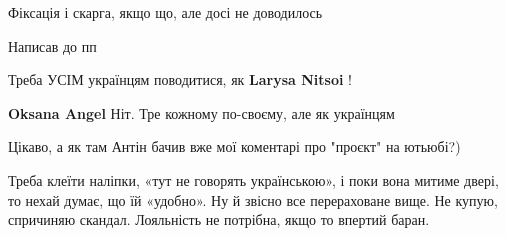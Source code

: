 \begin{itemize}
 
Фіксація і скарга, якщо що, але досі не доводилось

 
Написав до пп

 
Треба УСІМ українцям поводитися, як \textbf{Larysa Nitsoi} !

 
\textbf{Oksana Angel} Ніт. Тре кожному по-своєму, але як українцям

 
Цікаво, а як там Антін бачив вже мої коментарі про "проєкт" на ютьюбі?)

 

Треба клеїти наліпки, «тут не говорять українською», і поки вона митиме двері,
то нехай думає, що їй «удобно». Ну й звісно все перераховане вище. Не купую,
спричиняю скандал. Лояльність не потрібна, якщо то впертий баран.

\begin{itemize}
 

\end{itemize}
\end{itemize}
